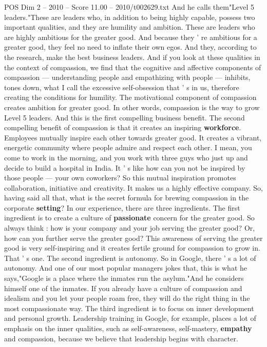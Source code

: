 \begin{textsample}{POS Dim 2 – 2010 – Score 11.00 – 2010/t002629.txt}
And he calls them"Level 5 leaders."These are leaders who, in addition to being highly capable, possess two important qualities, and they are humility and ambition.
These are leaders who are highly ambitious for the greater good.
And because they ' re ambitious for a greater good, they feel no need to inflate their own egos.
And they, according to the research, make the best business leaders.
And if you look at these qualities in the context of compassion, we find that the cognitive and affective components of compassion — understanding people and empathizing with people — inhibits, tones down, what I call the excessive self-obsession that ' s in us, therefore creating the conditions for humility.
The motivational component of compassion creates ambition for greater good.
In other words, compassion is the way to grow Level 5 leaders.
And this is the first compelling business benefit.
The second compelling benefit of compassion is that it creates an inspiring \textbf{workforce}.
Employees mutually inspire each other towards greater good.
It creates a vibrant, energetic community where people admire and respect each other.
I mean, you come to work in the morning, and you work with three guys who just up and decide to build a hospital in India.
It ' s like how can you not be inspired by those people — your own coworkers?
So this mutual inspiration promotes collaboration, initiative and creativity.
It makes us a highly effective company.
So, having said all that, what is the secret formula for brewing compassion in the corporate \textbf{setting}?
In our experience, there are three ingredients.
The first ingredient is to create a culture of \textbf{passionate} concern for the greater good.
So always think : how is your company and your job serving the greater good?
Or, how can you further serve the greater good?
This awareness of serving the greater good is very self-inspiring and it creates fertile ground for compassion to grow in.
That ' s one.
The second ingredient is autonomy.
So in Google, there ' s a lot of autonomy.
And one of our most popular managers jokes that, this is what he says,"Google is a place where the inmates run the asylum."And he considers himself one of the inmates.
If you already have a culture of compassion and idealism and you let your people roam free, they will do the right thing in the most compassionate way.
The third ingredient is to focus on inner development and personal growth.
Leadership training in Google, for example, places a lot of emphasis on the inner qualities, such as self-awareness, self-mastery, \textbf{empathy} and compassion, because we believe that leadership begins with character.

\end{textsample}
